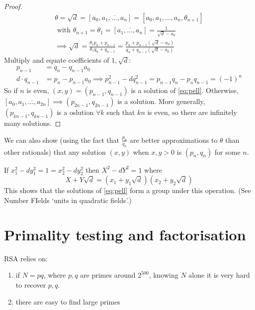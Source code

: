 \documentclass{article}
\begin{document}
\begin{proof}
    \begin{gather*}
        \theta = \sqrt{d} = [a_0, \overline{a_1, \dotsc, a_n}] = [a_0, a_1, \dotsc, a_n, \theta_{n+1}]\\ \text{ with } \theta_{n+1} = \theta_1 = [\overline{a_1, \dotsc, a_n}] = \frac{1}{\sqrt{d} - a_0} \\
        \implies \sqrt{d} = \frac{\theta_1 p_n + p_{n-1}}{\theta_1 q_n + q_{n-1}} = \frac{p_n + p_{n-1} (\sqrt{d} - a_0)}{q_n + q_{n-1} (\sqrt{d} - a_0)}
    \end{gather*}
    Multiply and equate coefficients of $1, \sqrt{d}$:
    \begin{align*}
        p_{n-1} &= q_n - q_{n-1} a_0 \\
        d \cdot q_{n-1} &= p_n - p_{n-1} a_0
        \implies p_{n-1}^2 - d q_{n-1}^2 = p_{n-1} q_n - p_n q_{n-1} = (-1)^n
    \end{align*}
    So if $n$ is even, $(x, y) = (p_{n-1}, q_{n-1})$ is a solution of \eqref{eq:pell}.
    Otherwise, $[a_0, \overline{a_1, \dotsc, a_{2n}}] \implies (p_{2n-1}, q_{2n-1})$ is a solution.
    More generally, $(p_{kn-1}, q_{kn-1})$ is a oslution $\forall k$ such that $kn$ is even, so there are infinitely many solutions.
\end{proof}

\begin{remark}
    We can also show (using the fact that $\frac{p_n}{q_n}$ are better approximations to $\theta$ than other rationals) that any solution $(x, y)$ when $x, y > 0$ is $(p_n, q_n)$ for some $n$.
\end{remark}

\begin{remark}
    If $x_1^2 - d y_1^2 = 1 = x_2^2 - d y_2^2$ then $X^2 - d Y^2 = 1$ where
    \begin{equation*}
        X + Y \sqrt{d} = (x_1 + y_1 \sqrt{d})(x_2 + y_2 \sqrt{d})
    \end{equation*}
    This shows that the solutions of \eqref{eq:pell} form a group under this operation. (See Number FIelds `units in quadratic fields'.)
\end{remark}

\section{Primality testing and factorisation}
RSA relies on:
\begin{enumerate}
    \item if $N=pq$, where $p, q$ are primes around $2^{500}$, knowing $N$ alone it is very hard to recover $p, q$.
    \item there are easy to find large primes
\end{enumerate}
\end{document}
